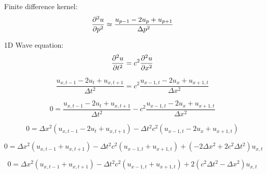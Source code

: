\documentclass[12pt]{article}
\begin{document}
Finite difference kernel:
\[ \pderivative{^2u}{p^2} \approx \frac{u_{p-1} - 2u_p + u_{p+1}}{\Delta p^2} \]

1D Wave equation:
\[ 
    \pderivative{^2u}{t^2} = c^2 \pderivative{^2u}{x^2}
\]

\[ 
    \frac{u_{x, t-1} - 2u_t + u_{x, t+1}}{\Delta t^2} = c^2 \frac{u_{x-1, t} - 2u_x + u_{x+1, t}}{\Delta x^2}
\]

\[ 
    0 = \frac{u_{x, t-1} - 2u_t + u_{x, t+1}}{\Delta t^2} - c^2 \frac{u_{x-1, t} - 2u_x + u_{x+1, t}}{\Delta x^2}
\]

\[ 
    0 = \Delta x^2 \left(u_{x, t-1} - 2u_t + u_{x, t+1}\right) - \Delta t^2 c^2 \left(u_{x-1, t} - 2u_x + u_{x+1, t}\right)
\]

\[ 
    0 = \Delta x^2 \left(u_{x, t-1} + u_{x, t+1}\right) - \Delta t^2 c^2 \left(u_{x-1, t} + u_{x+1, t}\right) + (-2 \Delta x^2 + 2 c^2 \Delta t^2) u_{x, t}
\]

\[ 
    0 = \Delta x^2 \left(u_{x, t-1} + u_{x, t+1}\right) - \Delta t^2 c^2 \left(u_{x-1, t} + u_{x+1, t}\right) + 2(c^2 \Delta t^2 - \Delta x^2) u_{x, t}
\]
\end{document}
